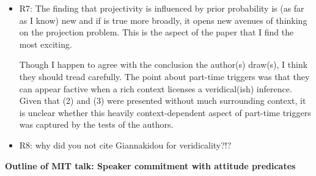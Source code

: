 \documentclass[11pt,fleqn]{article}
\newcommand{\6}{\mbox{$[\hspace*{-.6mm}[$}}
\newcommand{\9}{\mbox{$]\hspace*{-.6mm}]$}}
\begin{document}
\begin{itemize}
\item R7: The finding that projectivity is influenced by prior probability is (as far as I know) new and if is true more broadly, it opens new avenues of thinking on the projection problem. This is the aspect of the paper that I find the most exciting.

Though I happen to agree with the conclusion the author(s) draw(s), I think they should tread carefully. The point about part-time triggers was that they can appear factive when a rich context licenses a veridical(ish) inference. Given that (2) and (3) were presented without much surrounding context, it is unclear whether this heavily context-dependent aspect of part-time triggers was captured by the tests of the authors.

\item R8: why did you not cite Giannakidou for veridicality?!?

\end{itemize}

\newpage

\noindent
{\bf Outline of MIT talk: Speaker commitment with attitude predicates}
\end{document}
